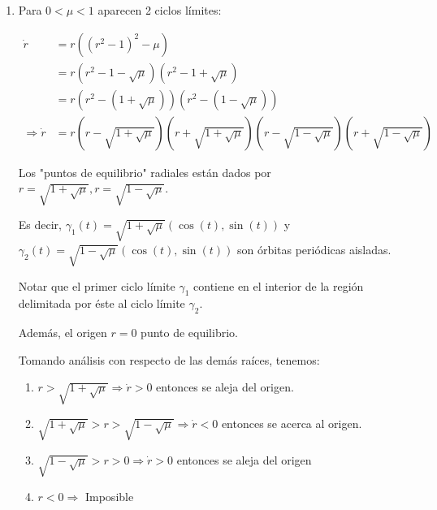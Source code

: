 \begin{exmp}
\begin{enumerate}
		Es decir, $\gamma(t) = \sqrt{ 1 + \sqrt{\mu}}(\cos(t),\sin(t) ) $ es una órbita periódica aislada.
		
		Además, el origen $r = 0$ punto de equilibrio.
		
		Sabemos que:
		
		\begin{enumerate}
			\item $r > \sqrt{1 + \sqrt{\mu} } \Rightarrow \dot{r} > 0$ entonces se aleja del origen.
			\item $0< r < \sqrt{1 + \sqrt{\mu} } \Rightarrow \dot{r} <0$ entonces se acerca al origen 
			\item $r < 0 \Rightarrow  $ Imposible
		\end{enumerate}
		
		Es decir, que trayectorias con punto inicial al interior de la circumferencia tienden (con orientación positiva) a espiralizar al origen. Asimismo, valores al exterior tienden a espiralizar al infinito.
		
		\item Para $0 < \mu < 1$ aparecen 2 ciclos límites:
		
		\begin{align*}
			\dot{r} &= r ((r^2 -1)^2 - \mu ) \\ 
			&= r(r^2-1 - \sqrt{\mu}) (r^2-1 + \sqrt{\mu}) \\
			&= r(r^2-(1+ \sqrt{\mu} )) (r^2-(1 - \sqrt{\mu}))\\
			\Rightarrow \dot{r} &= r(r - \sqrt{1 + \sqrt{\mu} })(r + \sqrt{1 + \sqrt{\mu} })(r - \sqrt{1 - \sqrt{\mu} })(r + \sqrt{1 - \sqrt{\mu} })
		\end{align*}
		
		
		Los "puntos de equilibrio" radiales están dados por $r = \sqrt{ 1 + \sqrt{\mu}} , r = \sqrt{ 1 - \sqrt{\mu}}$. 
		
		Es decir, $\gamma_1(t) = \sqrt{ 1 + \sqrt{\mu}}(\cos(t),\sin(t) ) $ y  $\gamma_2(t) = \sqrt{ 1 - \sqrt{\mu}}(\cos(t),\sin(t) ) $ son órbitas periódicas aisladas. 
		
		Notar que el primer ciclo límite $\gamma_1$ contiene en el interior de la región delimitada por éste al ciclo límite $\gamma_2$.
		
		Además, el origen $r = 0$ punto de equilibrio.
		
		Tomando análisis con respecto de las demás raíces, tenemos:
		
		\begin{enumerate}
			\item $r > \sqrt{1 + \sqrt{\mu} } \Rightarrow \dot{r} > 0$ entonces se aleja del origen.
			\item $ \sqrt{1 + \sqrt{\mu} } > r > \sqrt{1 -  \sqrt{\mu} }\Rightarrow \dot{r} < 0$ entonces se acerca al origen.
			\item $\sqrt{1 - \sqrt{\mu} } > r  > 0 \Rightarrow \dot{r} > 0$ entonces se aleja del origen 
			\item $r < 0 \Rightarrow  $ Imposible
		\end{enumerate}
		

\end{enumerate}
\end{exmp}
